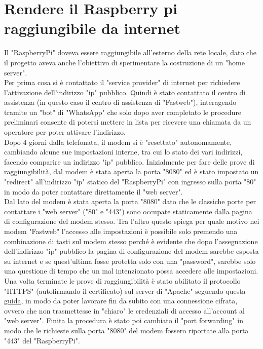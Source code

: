 \section{Rendere il Raspberry pi raggiungibile da internet}\label{sez:Rendere il Raspberry pi raggiungibile da internet}
\raggedright
Il "RaspberryPi" doveva essere raggiungibile all'esterno della rete locale, dato che  il progetto aveva anche l'obiettivo di sperimentare la costruzione di un "home server".\\
Per prima cosa si è contattato il "service provider" di internet per richiedere l'attivazione dell'indirizzo "ip" pubblico. Quindi è stato contattato il centro di assistenza (in questo caso il centro di assistenza di "Fastweb"), interagendo tramite un "bot" di "WhatsApp" che solo dopo aver completato le procedure preliminari consente di potersi mettere in lista per ricevere una chiamata da un operatore per poter attivare l'indirizzo.\\
Dopo 4 giorni dalla telefonata, il modem si è "resettato" autonomamente, cambiando alcune sue impostazioni interne, tra cui lo stato dei vari indirizzi, facendo comparire un indirizzo "ip" pubblico. 
Inizialmente per fare delle prove di raggiungibilità, dal modem è stata aperta la porta "8080" ed è stato impostato un "redirect" all'indirizzo "ip" statico del "RaspberryPi" con ingresso sulla porta "80" in modo da poter contattare direttamente il "web server".\\
Dal lato del modem è stata aperta la porta "8080" dato che le classiche porte  per contattare i "web server" ("80" e "443") sono occupate staticamente dalla pagina di configurazione del modem stesso. Tra l'altro questo spiega per quale motivo nei modem "Fastweb" l'accesso alle impostazioni è possibile solo premendo una combinazione di tasti sul modem stesso perché è evidente che dopo l'assegnazione dell'indirizzo "ip" pubblico la pagina di configurazione del modem sarebbe esposta su internet e se quest'ultima fosse protetta solo con una "password", sarebbe solo una questione di tempo che un mal intenzionato possa accedere alle impostazioni.\\
Una volta terminate le prove di raggiungibilità è stato abilitato il protocollo "HTTPS" (autofirmando il certificato) sul server di "Apache" seguendo questa \href{https://peppe8o.com/self-signed-certificate-https-in-raspberry-pi-with-apache/}{guida}, in modo da poter lavorare fin da subito con una connessione cifrata, ovvero che non trasmettesse in "chiaro" le credenziali di accesso all'account al "web server". Finita la procedura è stato poi cambiato il "port forwarding" in modo che le richieste sulla porta "8080" del modem fossero riportate alla porta "443" del "RaspberryPi".\\
